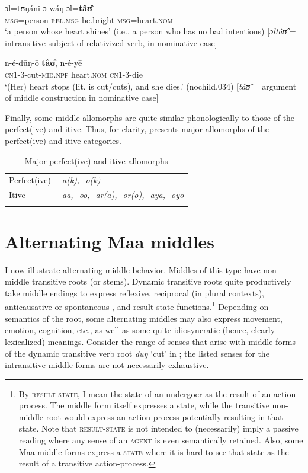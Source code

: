 \documentclass[output=paper,colorlinks,citecolor=brown
]{langscibook}
\begin{document}
\ea \label{ex:Payne:active-intrans}
\gll ɔl=tʊŋáni ɔ-wáŋ ɔl=\textbf{tâʊ̂} \\
\textsc{msg}=person \textsc{rel.msg}-be.bright \textsc{msg}=heart.\textsc{nom}\\ 
\glt `a person whose heart shines' (i.e., a person who has no bad intentions)
[\textit{ɔltâʊ̂} = intransitive subject of relativized verb, in nominative case]
\z 

\ea \label{ex:Payne:middle}
\gll n-é-dūŋ-ō \textbf{tâʊ̂}, n-é-yē \\
\textsc{cn1}-3-cut-\textsc{mid.npf} heart.\textsc{nom} \textsc{cn1}-3-die\\
\glt `(Her) heart stops (lit. is cut/cuts), and she dies.' (nochild.034)
[\textit{tâʊ̂} = argument of middle construction in nominative case] 
\z 

Finally, some middle allomorphs are quite similar phonologically to those of the perfect(ive) and itive. Thus, for clarity,  presents major allomorphs of the perfect(ive) and itive categories.

\begin{table}
\caption{Major perfect(ive) and itive allomorphs}
\label{tab:Payne:Perfect-Itive}
\begin{tabular}{ll}
\lsptoprule
Perfect(ive) & \textit{-a(k), -o(k)}\\
Itive & \textit{-aa, -oo, -ar(a), -or(o), -aya, -oyo}\\
\lspbottomrule
\end{tabular}
\end{table}

\section{Alternating Maa middles}\label{sec:Payne:Alternating}

I now illustrate alternating middle behavior. Middles of this type have non-middle transitive roots (or stems). Dynamic transitive roots quite productively take middle endings to express reflexive, reciprocal (in plural contexts), anticausative or spontaneous \citep{Haspelmath1987}, and result-state functions.\footnote{By \textsc{result-state}, I mean the state of an undergoer as the result of an action-process. The middle form itself expresses a state, while the transitive non-middle root would express an action-process potentially resulting in that state. Note that \textsc{result-state} is not intended to (necessarily) imply a passive reading where any sense of an \textsc{agent} is even semantically retained. Also, some Maa middle forms express a \textsc{state} where it is hard to see that state as the result of a transitive action-process.} Depending on semantics of the root, some alternating middles may also express movement, emotion, cognition, etc., as well as some quite idiosyncratic (hence, clearly lexicalized) meanings. Consider the range of senses that arise with middle forms of the dynamic transitive verb root \textit{duŋ} `cut' in ; the listed senses for the intransitive middle forms are not necessarily exhaustive.
\end{document}
